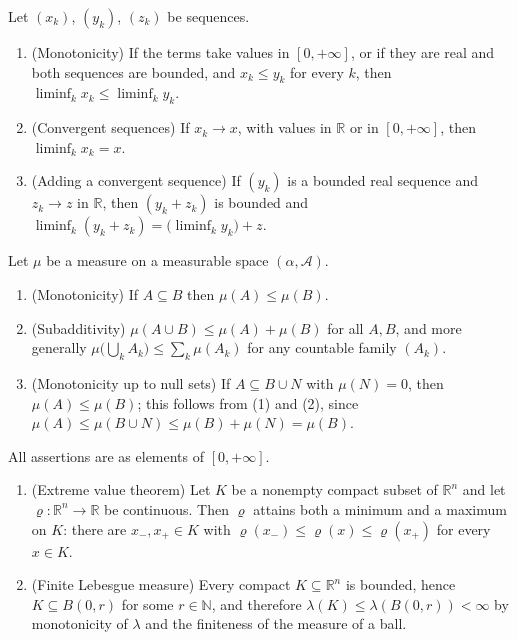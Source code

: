 \begin{proposition}
Let $(x_k)$, $(y_k)$, $(z_k)$ be sequences.
\begin{enumerate}
\item (Monotonicity) If the terms take values in $[0,+\infty]$, or if they are
real and both sequences are bounded, and $x_k \leq y_k$ for every $k$, then
$\liminf_k x_k \leq \liminf_k y_k$.
\item (Convergent sequences) If $x_k \to x$, with values in $\mathbb{R}$ or in
$[0,+\infty]$, then $\liminf_k x_k = x$.
\item (Adding a convergent sequence) If $(y_k)$ is a bounded real sequence and
$z_k \to z$ in $\mathbb{R}$, then $(y_k + z_k)$ is bounded and
$\liminf_k (y_k + z_k) = \bigl(\liminf_k y_k\bigr) + z$.
\end{enumerate}
\end{proposition}
\begin{proposition}
Let $\mu$ be a measure on a measurable space $(\alpha, \mathcal{A})$.
\begin{enumerate}
\item (Monotonicity) If $A \subseteq B$ then $\mu(A) \leq \mu(B)$.
\item (Subadditivity) $\mu(A \cup B) \leq \mu(A) + \mu(B)$ for all $A, B$, and
more generally $\mu\bigl(\bigcup_{k} A_k\bigr) \leq \sum_k \mu(A_k)$ for any
countable family $(A_k)$.
\item (Monotonicity up to null sets) If $A \subseteq B \cup N$ with
$\mu(N) = 0$, then $\mu(A) \leq \mu(B)$; this follows from (1) and (2), since
$\mu(A) \leq \mu(B \cup N) \leq \mu(B) + \mu(N) = \mu(B)$.
\end{enumerate}
All assertions are as elements of $[0,+\infty]$.
\end{proposition}
\begin{proposition}
\begin{enumerate}
\item (Extreme value theorem) Let $K$ be a nonempty compact subset of
$\mathbb{R}^n$ and let $\varrho : \mathbb{R}^n \to \mathbb{R}$ be continuous.
Then $\varrho$ attains both a minimum and a maximum on $K$: there are
$x_-, x_+ \in K$ with $\varrho(x_-) \leq \varrho(x) \leq \varrho(x_+)$ for every
$x \in K$.
\item (Finite Lebesgue measure) Every compact $K \subseteq \mathbb{R}^n$ is
bounded, hence $K \subseteq B(0,r)$ for some $r \in \mathbb{N}$, and therefore
$\lambda(K) \leq \lambda(B(0,r)) < \infty$ by monotonicity of $\lambda$ and the
finiteness of the measure of a ball.
\end{enumerate}
\end{proposition}
